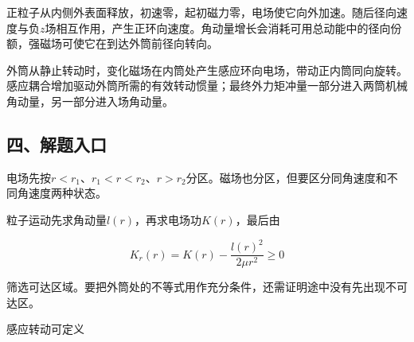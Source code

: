 \documentclass[12pt,a4paper,fontset=fandol]{ctexart}
\begin{document}
正粒子从内侧外表面释放，初速零，起初磁力零，电场使它向外加速。随后径向速度与负\(z\)场相互作用，产生正环向速度。角动量增长会消耗可用总动能中的径向份额，强磁场可使它在到达外筒前径向转向。

\begin{center}
\begin{minipage}{\linewidth}
\centering\begingroup{}
\ifdim\wd\diagrambox>.88\linewidth
\sbox{\diagrambox}{\resizebox{.88\linewidth}{!}{\usebox{\diagrambox}}}\fi
\ifdim\ht\diagrambox>.38\textheight
\resizebox{!}{.38\textheight}{\usebox{\diagrambox}}
\else\usebox{\diagrambox}\fi
\par{}\endgroup\end{minipage}\end{center}

外筒从静止转动时，变化磁场在内筒处产生感应环向电场，带动正内筒同向旋转。感应耦合增加驱动外筒所需的有效转动惯量；最终外力矩冲量一部分进入两筒机械角动量，另一部分进入场角动量。

\subsection{四、解题入口}\label{ux56dbux89e3ux9898ux5165ux53e3-5}

电场先按\(r<r_1\)、\(r_1<r<r_2\)、\(r>r_2\)分区。磁场也分区，但要区分同角速度和不同角速度两种状态。

粒子运动先求角动量\(l(r)\)，再求电场功\(K(r)\)，最后由

\[
K_r(r)=K(r)-\frac{l(r)^2}{2\mu r^2}\geq0
\]

筛选可达区域。要把外筒处的不等式用作充分条件，还需证明途中没有先出现不可达区。

感应转动可定义
\end{document}
